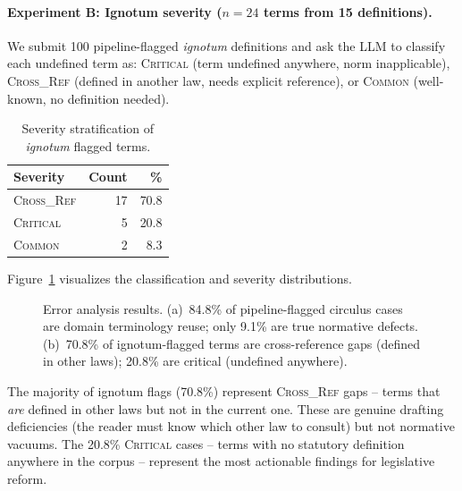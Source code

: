 \documentclass[11pt]{article}
\begin{document}
\paragraph{Experiment B: Ignotum severity ($n=24$ terms from 15 definitions).}
We submit 100 pipeline-flagged \emph{ignotum} definitions and ask the LLM to classify each undefined term as: \textsc{Critical} (term undefined anywhere, norm inapplicable), \textsc{Cross\_Ref} (defined in another law, needs explicit reference), or \textsc{Common} (well-known, no definition needed).

\begin{table}[t]
\centering
\caption{Severity stratification of \emph{ignotum} flagged terms.}
\label{tab:ignotum-severity}
\begin{tabular}{lrr}
\toprule
\textbf{Severity} & \textbf{Count} & \textbf{\%} \\
\midrule
\textsc{Cross\_Ref} & 17 & 70.8 \\
\textsc{Critical} & 5 & 20.8 \\
\textsc{Common} & 2 & 8.3 \\
\bottomrule
\end{tabular}
\end{table}

Figure~\ref{fig:error-analysis} visualizes the classification and severity distributions.

\begin{figure}[t]
\centering

\caption{Error analysis results. (a)~84.8\% of pipeline-flagged circulus cases are domain terminology reuse; only 9.1\% are true normative defects. (b)~70.8\% of ignotum-flagged terms are cross-reference gaps (defined in other laws); 20.8\% are critical (undefined anywhere).}
\label{fig:error-analysis}
\end{figure}

The majority of ignotum flags (70.8\%) represent \textsc{Cross\_Ref} gaps -- terms that \emph{are} defined in other laws but not in the current one.
These are genuine drafting deficiencies (the reader must know which other law to consult) but not normative vacuums.
The 20.8\% \textsc{Critical} cases -- terms with no statutory definition anywhere in the corpus -- represent the most actionable findings for legislative reform.
\end{document}
